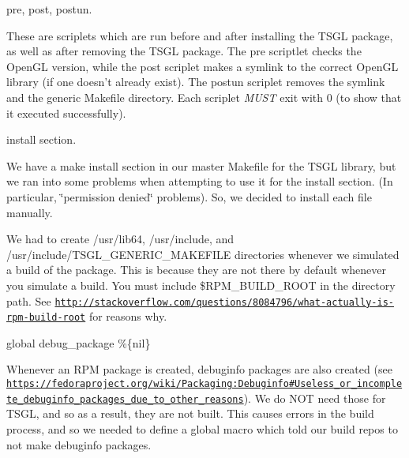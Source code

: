 \begin{DoxyItemize}
\item {\ttfamily pre}, {\ttfamily post}, {\ttfamily postun}.
\begin{DoxyItemize}
\item These are scriplets which are run before and after installing the T\-S\-G\-L package, as well as after removing the T\-S\-G\-L package. The {\ttfamily pre} scriptlet checks the Open\-G\-L version, while the {\ttfamily post} scriplet makes a symlink to the correct Open\-G\-L library (if one doesn't already exist). The {\ttfamily postun} scriplet removes the symlink and the generic Makefile directory. Each scriplet {\itshape M\-U\-S\-T} exit with 0 (to show that it executed successfully).
\end{DoxyItemize}
\item {\ttfamily install} section.
\begin{DoxyItemize}
\item We have a make install section in our master Makefile for the T\-S\-G\-L library, but we ran into some problems when attempting to use it for the install section. (In particular, \char`\"{}permission denied\char`\"{} problems). So, we decided to install each file manually.
\item We had to create {\ttfamily /usr/lib64}, {\ttfamily /usr/include}, and {\ttfamily /usr/include/\-T\-S\-G\-L\-\_\-\-G\-E\-N\-E\-R\-I\-C\-\_\-\-M\-A\-K\-E\-F\-I\-L\-E} directories whenever we simulated a build of the package. This is because they are not there by default whenever you simulate a build. You must include {\ttfamily \$\-R\-P\-M\-\_\-\-B\-U\-I\-L\-D\-\_\-\-R\-O\-O\-T} in the directory path. See \href{http://stackoverflow.com/questions/8084796/what-actually-is-rpm-build-root}{\tt http\-://stackoverflow.\-com/questions/8084796/what-\/actually-\/is-\/rpm-\/build-\/root} for reasons why.
\end{DoxyItemize}
\item {\ttfamily global debug\-\_\-package \%\{nil\}}
\begin{DoxyItemize}
\item Whenever an R\-P\-M package is created, debuginfo packages are also created (see \href{https://fedoraproject.org/wiki/Packaging:Debuginfo#Useless_or_incomplete_debuginfo_packages_due_to_other_reasons}{\tt https\-://fedoraproject.\-org/wiki/\-Packaging\-:\-Debuginfo\#\-Useless\-\_\-or\-\_\-incomplete\-\_\-debuginfo\-\_\-packages\-\_\-due\-\_\-to\-\_\-other\-\_\-reasons}). We do N\-O\-T need those for T\-S\-G\-L, and so as a result, they are not built. This causes errors in the build process, and so we needed to define a global macro which told our build repos to not make debuginfo packages.

\end{DoxyItemize}
\end{DoxyItemize}
